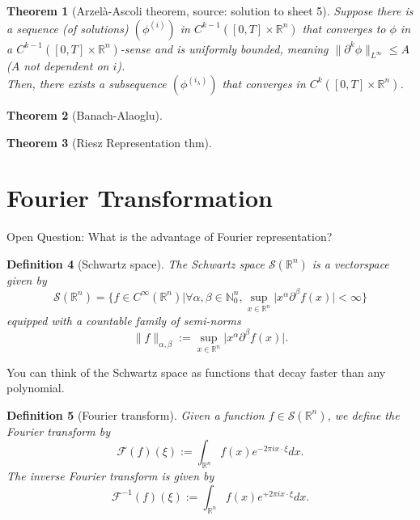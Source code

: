 \documentclass[12pt,a4paper]{article}
\newtheorem{definition}{Definition}
\newtheorem{thm}[definition]{Theorem}
\newcommand{\Rn}{\mathbb{R}^n}
\begin{document}
\begin{thm}[Arzelà-Ascoli theorem, source: solution to sheet 5]
Suppose there is a sequence (of solutions) $(\phi^{(i)})$ in $C^{k-1}([0,T]\times \mathbb{R}^n)$ that converges to $\phi$ in a $C^{k-1}([0,T]\times \mathbb{R}^n)$-sense and is uniformly bounded, meaning $\lVert \partial ^k \phi \rVert _{L^{\infty}} \leq A$ ($A$ not dependent on $i$).\\
Then, there exists a subsequence $(\phi^{(i_{\lambda})})$ that converges in $C^{k}([0,T]\times \mathbb{R}^n)$.
\end{thm}

\begin{thm}[Banach-Alaoglu]
\end{thm}

\begin{thm}[Riesz Representation thm]
\end{thm}

\section{Fourier Transformation}

Open Question: What is the advantage of Fourier representation?

\begin{definition}[Schwartz space]
The Schwartz space $\mathcal{S}(\mathbb{R}^n)$ is a vectorspace given by
\begin{equation}
\mathcal{S}(\mathbb{R}^n)=\{f\in C^{\infty}(\mathbb{R}^n)\lvert \forall \alpha,\beta\in \mathbb{N}^n_0, \sup_{x\in\mathbb{R}^n}\lvert x^{\alpha}\partial^{\beta}f(x)\rvert <\infty\}
\end{equation}
equipped with a countable family of semi-norms
\begin{equation}
\lVert f \rVert_{\alpha,\beta} := \sup_{x\in\mathbb{R}^n}\lvert x^{\alpha}\partial^{\beta}f(x)\rvert.
\end{equation}
\end{definition}

You can think of the Schwartz space as functions that decay faster than any polynomial.

\begin{definition}[Fourier transform]
Given a function $f\in \mathcal{S}(\mathbb{R}^n)$, we define the Fourier transform by
\begin{equation}
\mathcal{F}(f)(\xi):=\int_{\Rn} f(x)e^{-2\pi ix\cdot \xi} dx.
\end{equation}
The inverse Fourier transform is given by
\begin{equation}
\mathcal{F}^{-1}(f)(\xi):=\int_{\Rn} f(x)e^{+2\pi ix\cdot \xi} dx.
\end{equation}
\end{definition}
\end{document}
